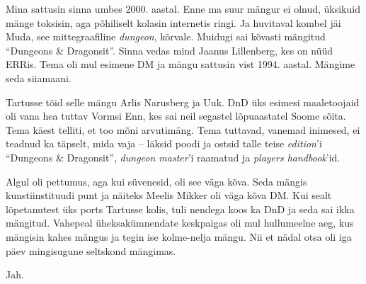 Mina sattusin sinna umbes 2000. aastal. Enne ma suur mängur ei olnud, 
üksikuid mänge toksisin, aga põhiliselt kolasin internetis ringi. Ja huvitaval kombel jäi Muda, see 
mittegraafiline \emph{dungeon}, kõrvale. Muidugi sai kõvasti mängitud 
\enquote{Dungeons \& Dragonsit}. Sinna vedas mind Jaanus 
Lillenberg, kes on nüüd ERRis. Tema oli mul 
esimene DM ja mängu sattusin 
vist 1994. aastal. Mängime seda siiamaani.


Tartusse tõid selle mängu Arlis 
Narusberg ja Uuk. DnD üks esimesi maaletoojaid oli vana 
hea tuttav Vormsi Enn, kes sai neil segastel lõpuaastatel Soome sõita. 
Tema käest telliti, et too mõni arvutimäng. Tema tuttavad, vanemad 
inimesed, ei teadnud ka täpselt, mida vaja -- läksid poodi ja ostsid talle teise 
\emph{edition}'i \enquote{Dungeons \& Dragonsit}, \emph{dungeon master}'i raamatud ja 
\emph{players handbook}'id. 

Algul oli pettumus, aga kui süvenesid, oli see väga kõva. Seda mängis 
kunstiinstituudi punt ja näiteks Meelis Mikker oli väga kõva DM. 
Kui sealt lõpetanutest üks ports Tartusse kolis, tuli nendega koos ka DnD ja 
seda sai ikka mängitud. Vahepeal üheksakümnendate keskpaigas oli mul 
hullumeelne aeg, kus mängisin kahes mängus ja tegin ise kolme-nelja 
mängu. Nii et nädal otsa oli iga päev mingisugune seltskond mängimas.


Jah.


